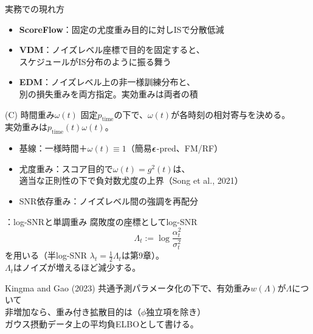\asmain
\begin{frame}{実務での現れ方}
    \begin{itemize}
        \item \textbf{ScoreFlow}：固定の尤度重み目的に対しISで分散低減
        \item \textbf{VDM}：ノイズレベル座標で目的を固定すると、\\
        スケジュールがIS分布のように振る舞う
        \item \textbf{EDM}：ノイズレベル上の非一様訓練分布と、\\
        別の損失重みを両方指定。実効重みは両者の積
    \end{itemize}
\end{frame}
\asmain
\begin{frame}{(C) 時間重み$\omega(t)$}
    固定$p_{\mathrm{time}}$の下で、$\omega(t)$が各時刻の相対寄与を決める。\\
    実効重みは$p_{\mathrm{time}}(t)\omega(t)$。
    \begin{itemize}
        \item 基線：一様時間＋$\omega(t)\equiv 1$（簡易$\bm{\epsilon}$-pred、FM/RF）
        \item 尤度重み：スコア目的で$\omega(t)=g^{2}(t)$は、\\
        適当な正則性の下で負対数尤度の上界（Song et al., 2021）
        \item SNR依存重み：ノイズレベル間の強調を再配分
    \end{itemize}
\end{frame}
\assuppl
\begin{frame}{\supplmark：log-SNRと単調重み}
    腐敗度の座標としてlog-SNR
    \[
        \Lambda_t
        :=
        \log\frac{\alpha_t^{2}}{\sigma_t^{2}}
    \]
    を用いる（半log-SNR $\lambda_t=\tfrac12\Lambda_t$は第9章）。\\
    $\Lambda_t$はノイズが増えるほど減少する。
    \begin{exampleblock}{Kingma and Gao (2023)}
        共通予測パラメータ化の下で、有効重み$w(\Lambda)$が$\Lambda$について\\
        非増加なら、重み付き拡散目的は（$\phi$独立項を除き）\\
        ガウス摂動データ上の平均負ELBOとして書ける。
    \end{exampleblock}
\end{frame}
